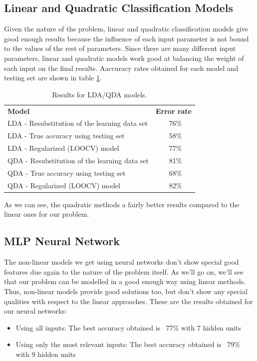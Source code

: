 \documentclass[english]{scrartcl}
\begin{document}
    \subsection{Linear and Quadratic Classification Models}
    Given the nature of the problem, linear and quadratic classification models give good enough results because the influence
    of each input parameter is not bound to the values of the rest of parameters. Since there are many different input parameters,
    linear and quadratic models work good at balancing the weight of each input on the final results. Aaccuracy rates obtained for each model and testing set are shown in table \ref{table:ldaqda-results}.
    
    \begin{table}[h]
    \centering
    \begin{tabular}{l c}
    \textbf{Model} & \textbf{Error rate} \\
    LDA - Resubstitution of the learning data set & ~76\% \\
    LDA - True accuracy using testing set & ~58\% \\
    LDA - Regularized (LOOCV) model & ~77\% \\
    QDA - Resubstitution of the learning data set & ~81\% \\
    QDA - True accuracy using testing set & ~68\% \\
    QDA - Regularized (LOOCV) model & ~82\% \\
    \end{tabular}
    \caption{Results for LDA/QDA models.}
    \label{table:ldaqda-results}
    \end{table}
    
    As we can see, the quadratic methods a fairly better results compared to the linear ones for our problem.
    
    \subsection{MLP Neural Network}\label{sec:results:nnet}
    The non-linear models we get using neural networks don't show special good features due again to the nature of the problem itself.
    As we'll go on, we'll see that our problem can be modelled in a good enough way using linear methods. Thus, non-linear models provide
    good solutions too, but don't show any special qualities with respect to the linear approaches. These are the results obtained for
    our neural networks:
    \begin{itemize}
    \item Using all inputs: The best accuracy obtained is ~77\% with 7 hidden units
    \item Using only the most relevant inputs: The best accuracy obtained is ~79\% with 9 hidden units
    \end{itemize}
    
\end{document}
